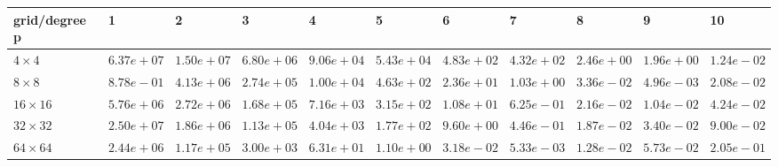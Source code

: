 \begin{tabular}{lllllllllll}
\hline
 grid/degree p   & 1          & 2          & 3          & 4          & 5          & 6          & 7          & 8          & 9          & 10         \\
\hline
 $4 \times 4$    & $6.37e+07$ & $1.50e+07$ & $6.80e+06$ & $9.06e+04$ & $5.43e+04$ & $4.83e+02$ & $4.32e+02$ & $2.46e+00$ & $1.96e+00$ & $1.24e-02$ \\
 $8 \times 8$    & $8.78e-01$ & $4.13e+06$ & $2.74e+05$ & $1.00e+04$ & $4.63e+02$ & $2.36e+01$ & $1.03e+00$ & $3.36e-02$ & $4.96e-03$ & $2.08e-02$ \\
 $16 \times 16$  & $5.76e+06$ & $2.72e+06$ & $1.68e+05$ & $7.16e+03$ & $3.15e+02$ & $1.08e+01$ & $6.25e-01$ & $2.16e-02$ & $1.04e-02$ & $4.24e-02$ \\
 $32 \times 32$  & $2.50e+07$ & $1.86e+06$ & $1.13e+05$ & $4.04e+03$ & $1.77e+02$ & $9.60e+00$ & $4.46e-01$ & $1.87e-02$ & $3.40e-02$ & $9.00e-02$ \\
 $64 \times 64$  & $2.44e+06$ & $1.17e+05$ & $3.00e+03$ & $6.31e+01$ & $1.10e+00$ & $3.18e-02$ & $5.33e-03$ & $1.28e-02$ & $5.73e-02$ & $2.05e-01$ \\
\hline
\end{tabular}